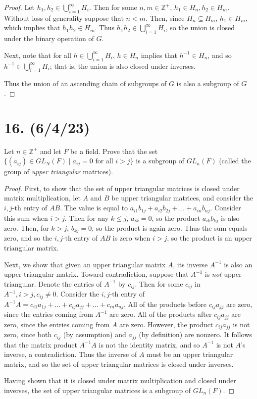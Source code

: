 \documentclass{article}
\begin{document}
\begin{proof}
    Let $h_1, h_2 \in \bigcup^\infty_{i = 1}{H_i}$. Then for some $n, m \in \mathbb{Z}^+$, $h_1 \in H_n, h_2 \in H_m$. Without loss of generality suppose that $n < m$. Then, since $H_n \subseteq H_m$, $h_1 \in H_m$, which implies that $h_1 h_2 \in H_m$. Thus $h_1 h_2 \in \bigcup^\infty_{i = 1}{H_i}$, so the union is closed under the binary operation of $G$.

    Next, note that for all $h \in \bigcup^\infty_{i = 1}{H_i}$, $h \in H_n$ implies that $h^{-1} \in H_n$, and so $h^{-1} \in \bigcup^\infty_{i = 1}{H_i}$; that is, the union is also closed under inverses.

    Thus the union of an ascending chain of subgroups of $G$ is also a subgroup of $G$.
\end{proof}

\section*{16. (6/4/23)}

Let $n \in \mathbb{Z}^+$ and let $F$ be a field. Prove that the set $\{ (a_{ij}) \in GL_N(F) \mid a_{ij} = 0 \text{ for all } i > j \}$ is a subgroup of $GL_n(F)$ (called the group of \emph{upper triangular} matrices).

\begin{proof}
    First, to show that the set of upper triangular matrices is closed under matrix multiplication, let $A$ and $B$ be upper triangular matrices, and consider the $i,j\text{-th}$ entry of $AB$. The value is equal to $a_{i1}b_{1j} + a_{i2}b_{2j} + ... + a_{in}b_{nj}$. Consider this sum when $i > j$. Then for any $k \leq j$, $a_{ik} = 0$, so the product $a_{ik}b_{kj}$ is also zero. Then, for $k > j$, $b_{kj} = 0$, so the product is again zero. Thus the sum equals zero, and so the $i,j\text{-th}$ entry of $AB$ is zero when $i > j$, so the product is an upper triangular matrix.

    Next, we show that given an upper triangular matrix $A$, its inverse $A^{-1}$ is also an upper triangular matrix. Toward contradiction, suppose that $A^{-1}$ is \emph{not} upper triangular. Denote the entries of $A^{-1}$ by $c_{ij}$. Then for some $c_{ij}$ in $A^{-1}, i > j, c_{ij} \neq 0$. Consider the $i,j$-th entry of $A^{-1}A = c_{i1}a_{1j} + ... + c_{ij}a_{jj} + ... + c_{in}a_{nj}$. All of the products before $c_{ij}a_{jj}$ are zero, since the entries coming from $A^{-1}$ are zero. All of the products after $c_{ij}a_{jj}$ are zero, since the entries coming from $A$ are zero. However, the product $c_{ij}a_{jj}$ is not zero, since both $c_{ij}$ (by assumption) and $a_{jj}$ (by definition) are nonzero. It follows that the matrix product $A^{-1}A$ is not the identity matrix, and so $A^{-1}$ is not $A$'s inverse, a contradiction. Thus the inverse of $A$ must be an upper triangular matrix, and so the set of upper triangular matrices is closed under inverses.

    Having shown that it is closed under matrix multiplication and closed under inverses, the set of upper triangular matrices is a subgroup of $GL_n(F)$.
\end{proof}
\end{document}
